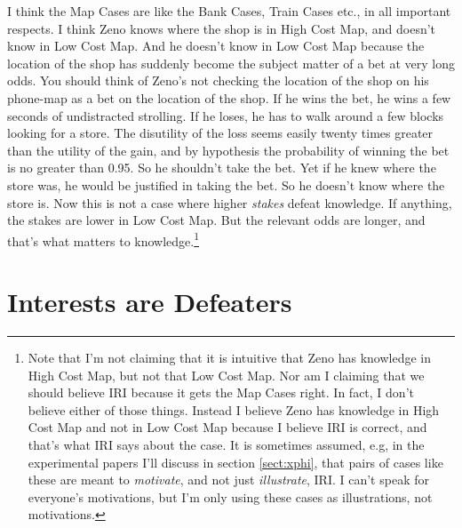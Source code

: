 \documentclass[oneside, a4paper]{book}
\begin{document}
\noindent I think the Map Cases are like the Bank Cases, Train Cases etc., in all important respects. I think Zeno knows where the shop is in High Cost Map, and doesn't know in Low Cost Map. And he doesn't know in Low Cost Map because the location of the shop has suddenly become the subject matter of a bet at very long odds. You should think of Zeno's not checking the location of the shop on his phone-map as a bet on the location of the shop. If he wins the bet, he wins a few seconds of undistracted strolling. If he loses, he has to walk around a few blocks looking for a store. The disutility of the loss seems easily twenty times greater than the utility of the gain, and by hypothesis the probability of winning the bet is no greater than 0.95. So he shouldn't take the bet. Yet  if he knew where the store was, he would be justified in taking the bet. So he doesn't know where the store is. Now this is not a case where higher \textit{stakes} defeat knowledge. If anything, the stakes are lower in Low Cost Map. But the relevant odds are longer, and that's what matters to knowledge.\footnote{Note that I'm not claiming that it is intuitive that Zeno has knowledge in High Cost Map, but not that Low Cost Map. Nor am I claiming that we should believe IRI because it gets the Map Cases right. In fact, I don't believe either of those things. Instead I believe Zeno has knowledge in High Cost Map and not in Low Cost Map because I believe IRI is correct, and that's what IRI says about the case. It is sometimes assumed, e.g, in the experimental papers I'll discuss in section \ref{sect:xphi}, that pairs of cases like these are meant to \textit{motivate}, and not just \textit{illustrate}, IRI. I can't speak for everyone's motivations, but I'm only using these cases as illustrations, not motivations.}

\section{Interests are Defeaters} \label{sect:defeat}
\end{document}
